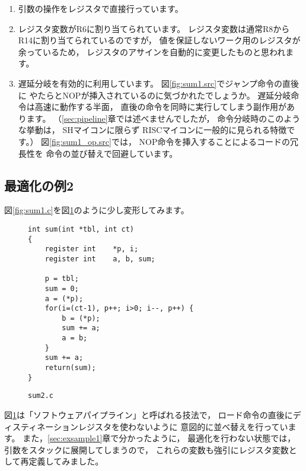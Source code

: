\documentclass[a4j,10pt,fleqn]{jsarticle}
\begin{document}
\begin{enumerate}

\item 引数の操作をレジスタで直接行っています。

\item レジスタ変数がR6に割り当てられています。
    レジスタ変数は通常R8からR14に割り当てられているのですが，
    値を保証しないワーク用のレジスタが余っているため，
    レジスタのアサインを自動的に変更したものと思われます。

\item 遅延分岐を有効的に利用しています。
    図\ref{fig:sum1.src}でジャンプ命令の直後に
    やたらとNOPが挿入されているのに気づかれたでしょうか。
    遅延分岐命令は高速に動作する半面，
    直後の命令を同時に実行してしまう副作用があります。
    （\ref{sec:pipeline}章では述べませんでしたが，
    命令分岐時のこのような挙動は，
    SHマイコンに限らず
    RISCマイコンに一般的に見られる特徴です。）
    図\ref{fig:sum1_op.src}では，
    NOP命令を挿入することによるコードの冗長性を
    命令の並び替えで回避しています。

\end{enumerate}


\clearpage
\subsection{最適化の例2}

図\ref{fig:sum1.c}を図\ref{fig:sum2.c}のように少し変形してみます。
\begin{figure}[tpb]
\begin{boxnote}
{\small\begin{verbatim}
int sum(int *tbl, int ct)
{
    register int    *p, i;
    register int    a, b, sum;

    p = tbl;
    sum = 0;
    a = (*p);
    for(i=(ct-1), p++; i>0; i--, p++) {
        b = (*p);
        sum += a;
        a = b;
    }
    sum += a;
    return(sum);
}
\end{verbatim}}
\end{boxnote}
\caption{\texttt{sum2.c}} \label{fig:sum2.c}
\end{figure}

図\ref{fig:sum2.c}は「ソフトウェアパイプライン」と呼ばれる技法で，
ロード命令の直後にディスティネーションレジスタを使わないように
意図的に並べ替えを行っています。
また，\ref{sec:exsample1}章で分かったように，
最適化を行わない状態では，引数をスタックに展開してしまうので，
これらの変数も強引にレジスタ変数として再定義してみました。
\end{document}
